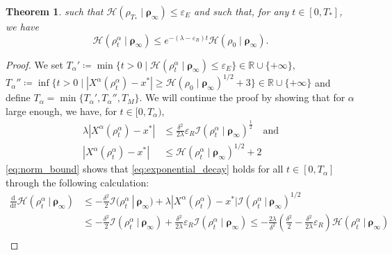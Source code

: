 \documentclass[reqno]{amsart}
\numberwithin{algorithm}{section}
\newcommand{\diff}{\mathrm{d}}
\newcommand{\R}{\mathbb{R}}
\newcommand{\Xalpha}{{X^\alpha}}
\newtheorem{theorem}{Theorem}[section]
\begin{document}
{\begin{theorem}
    such that $\mathcal H(\rho_{T_*}\mid \boldsymbol\rho_\infty)\leq \varepsilon_E$ and such that, for any $t\in[0,T_*]$, we have
    \begin{equation}\label{eq:exponential_decay}
        \mathcal H(\rho^\alpha_t \mid \boldsymbol\rho_\infty) \leq e^{-(\lambda - \varepsilon_R) t} \mathcal H(\rho_0 \mid \boldsymbol\rho_\infty).
    \end{equation}
\end{theorem}
\begin{proof}
    We set $T_\alpha' \coloneqq \min\{t > 0 \mid \mathcal H(\rho^\alpha_t \mid \boldsymbol\rho_\infty) \leq \varepsilon_{E}\} \in \R \cup \{+\infty\}$, $T_\alpha'' \coloneqq \inf\{t > 0 \mid | \Xalpha(\rho^\alpha_t) - x^* | \geq \mathcal H(\rho_0 \mid \boldsymbol\rho_\infty)^{1/2} + 3\} \in \R \cup \{+\infty\}$ and define $T_\alpha = \min\{T_\alpha', T_\alpha'', T_M\}$.
    We will continue the proof by showing that for $\alpha$ large enough, we have, for $t \in [0, T_\alpha)$,
    \begin{align}
        \lambda | \Xalpha(\rho^\alpha_t) - x^* | &\leq \frac{\delta^2}{2\lambda} \varepsilon_R \mathcal I(\rho^\alpha_t \mid \boldsymbol\rho_\infty)^\frac{1}{2} \quad \text{and} \label{eq:norm_bound} \\
        | \Xalpha(\rho^\alpha_t) - x^* | &\leq \mathcal H(\rho^\alpha_t \mid \boldsymbol\rho_\infty)^{1/2} + 2  \label{eq:norm_bound_2}
    \end{align}
    \cref{eq:norm_bound} shows that \eqref{eq:exponential_decay} holds for all $t \in [0, T_\alpha]$ through the following calculation:
    \begin{align*}
                \frac{\diff}{\diff t}\mathcal H(\rho^\alpha_t\ | \ \boldsymbol\rho_\infty) &\leq -\frac{\delta^2}{2}\mathcal I(\rho^\alpha_t\ |\ \boldsymbol\rho_\infty ) + \lambda|\Xalpha(\rho^\alpha_t) - x^*|\mathcal I(\rho^\alpha_t\ |\ \boldsymbol\rho_\infty ) ^{1/2} \\
                &\leq -\frac{\delta^2}{2}\mathcal I(\rho^\alpha_t\ |\ \boldsymbol\rho_\infty ) + \frac{\delta^2}{2\lambda} \varepsilon_R \mathcal I(\rho^\alpha_t \mid \boldsymbol\rho_\infty) \leq -\frac{2\lambda}{\delta^2} \left(\frac{\delta^2}{2} - \frac{\delta^2}{2\lambda} \varepsilon_R\right) \mathcal H(\rho^\alpha_t\ |\ \boldsymbol\rho_\infty) \\

\end{align*}
\end{proof}}
\end{document}

